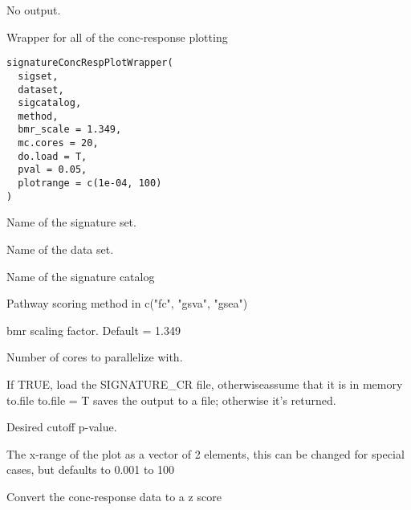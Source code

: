 \documentclass[letterpaper]{book}
\begin{document}
%
\begin{Value}
No output.
\end{Value}
%
\begin{Description}\relax
Wrapper for all of the conc-response plotting
\end{Description}
%
\begin{Usage}
\begin{verbatim}
signatureConcRespPlotWrapper(
  sigset,
  dataset,
  sigcatalog,
  method,
  bmr_scale = 1.349,
  mc.cores = 20,
  do.load = T,
  pval = 0.05,
  plotrange = c(1e-04, 100)
)
\end{verbatim}
\end{Usage}
%
\begin{Arguments}
\begin{ldescription}
\item[\code{sigset}] Name of the signature set.

\item[\code{dataset}] Name of the data set.

\item[\code{sigcatalog}] Name of the signature catalog

\item[\code{method}] Pathway scoring method in c("fc", "gsva", "gsea")

\item[\code{bmr\_scale}] bmr scaling factor. Default = 1.349

\item[\code{mc.cores}] Number of cores to parallelize with.

\item[\code{do.load}] If TRUE, load the SIGNATURE\_CR file, otherwiseassume that it is in memory
to.file to.file = T saves the output to a file; otherwise it's returned.

\item[\code{pval}] Desired cutoff p-value.

\item[\code{plotrange}] The x-range of the plot as a vector of 2 elements, this can be changed for special cases, but defaults to 0.001 to 100
\end{ldescription}
\end{Arguments}
%
\begin{Description}\relax
Convert the conc-response data to a z score
\end{Description}
\end{document}
